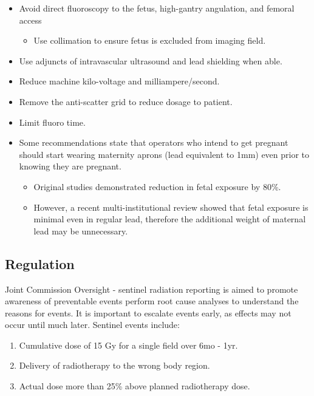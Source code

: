 \documentclass[
]{book}
\providecommand{\tightlist}{%
  \setlength{\itemsep}{0pt}\setlength{\parskip}{0pt}}
\begin{document}
\begin{itemize}
\item
  Avoid direct fluoroscopy to the fetus, high-gantry angulation, and
  femoral access

  \begin{itemize}
  \tightlist
  \item
    Use collimation to ensure fetus is excluded from imaging field.
  \end{itemize}
\item
  Use adjuncts of intravascular ultrasound and lead shielding when
  able.
\item
  Reduce machine kilo-voltage and milliampere/second.
\item
  Remove the anti-scatter grid to reduce dosage to patient.\citep{tomà2019}
\item
  Limit fluoro time.
\item
  Some recommendations state that operators who intend to get pregnant
  should start wearing maternity aprons (lead equivalent to 1mm) even
  prior to knowing they are pregnant.\citep{shaw2011}

  \begin{itemize}
  \item
    Original studies demonstrated reduction in fetal exposure by
    80\%.\citep{witrak1984}
  \item
    However, a recent multi-institutional review showed that fetal
    exposure is minimal even in regular lead, therefore the
    additional weight of maternal lead may be
    unnecessary.\citep{chandra2013}
  \end{itemize}
\end{itemize}

\hypertarget{regulation}{%
\subsection{Regulation}\label{regulation}}

Joint Commission Oversight - sentinel radiation reporting is aimed to
promote awareness of preventable events perform root cause analyses to
understand the reasons for events.\citep{thejointcommission2019} It is
important to escalate events early, as effects may not occur until much
later.\citep{arbique} Sentinel events include:

\begin{enumerate}
\def\labelenumi{\arabic{enumi}.}
\item
  Cumulative dose of 15 Gy for a single field over 6mo - 1yr.
\item
  Delivery of radiotherapy to the wrong body region.
\item
  Actual dose more than 25\% above planned radiotherapy
  dose.\citep{jones2011}
\end{enumerate}
\end{document}
